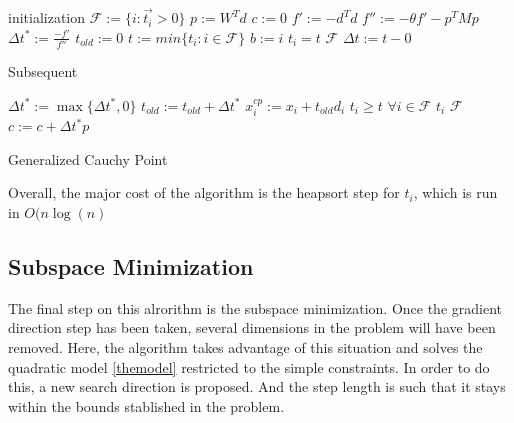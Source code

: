 \linesnumbered
\begin{algorithm}[H]
 \SetLine %
 
 initialization\;
 $\mathcal{F} := \{i: \vec{t_i} > 0\}$\;
 $p := W^Td$\;
 $c := 0$\;
 $f' := -d^Td$\;
 $f'' := - \theta f' - p^TMp$\;
 $\Delta t^* := \frac{-f'}{f''}$\;
 $t_{old} := 0$\;
 $t := min\{t_i: i \in \mathcal{F} \}$\;
 $b := i$  $t_i = t$ \;
  $\mathcal{F}$\;
 $\Delta t := t - 0$\;
 
 Subsequent\;
 
 $\Delta t^* := \max \{ \Delta t^*, 0\}$\;
 $t_{old} := t_{old} + \Delta t^*$\;
 $x_i^{cp} := x_i + t_{old}d_i$  $t_i \geq t$\;
 $\forall i \in \mathcal{F}$  $t_i$  $\mathcal{F}$\;
 $c := c + \Delta t^* p$\;
 \caption{Generalized Cauchy Point\label{CPalgo}}
\end{algorithm}

Overall, the major cost of the algorithm is the heapsort step for $t_i$, which is run in $O(n \log(n)$


\subsection{Subspace Minimization}

The final step on this alrorithm is the subspace minimization. Once the gradient direction step has been taken, several dimensions in the problem will have been removed. Here, the algorithm takes advantage of this situation and solves the quadratic model \ref{themodel} restricted to the simple constraints. In order to do this, a new search direction is proposed. And the step length is such that it stays within the bounds stablished in the problem.

